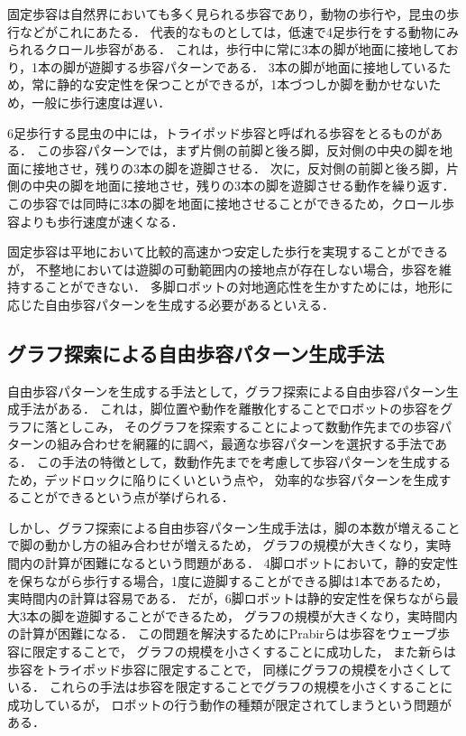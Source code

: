 固定歩容は自然界においても多く見られる歩容であり，動物の歩行や，昆虫の歩行などがこれにあたる．
代表的なものとしては，低速で4足歩行をする動物にみられるクロール歩容がある．
これは，歩行中に常に3本の脚が地面に接地しており，1本の脚が遊脚する歩容パターンである．
3本の脚が地面に接地しているため，常に静的な安定性を保つことができるが，1本づつしか脚を動かせないため，一般に歩行速度は遅い．

6足歩行する昆虫の中には，トライポッド歩容と呼ばれる歩容をとるものがある．
この歩容パターンでは，まず片側の前脚と後ろ脚，反対側の中央の脚を地面に接地させ，残りの3本の脚を遊脚させる．
次に，反対側の前脚と後ろ脚，片側の中央の脚を地面に接地させ，残りの3本の脚を遊脚させる動作を繰り返す．
この歩容では同時に3本の脚を地面に接地させることができるため，クロール歩容よりも歩行速度が速くなる．

固定歩容は平地において比較的高速かつ安定した歩行を実現することができるが，
不整地においては遊脚の可動範囲内の接地点が存在しない場合，歩容を維持することができない．
多脚ロボットの対地適応性を生かすためには，地形に応じた自由歩容パターンを生成する必要があるといえる．

\subsection{グラフ探索による自由歩容パターン生成手法}
自由歩容パターンを生成する手法として，グラフ探索による自由歩容パターン生成手法がある\cite{Prabir_Graph_search}．
これは，脚位置や動作を離散化することでロボットの歩容をグラフに落としこみ，
そのグラフを探索することによって数動作先までの歩容パターンの組み合わせを網羅的に調べ，最適な歩容パターンを選択する手法である．
この手法の特徴として，数動作先までを考慮して歩容パターンを生成するため，デッドロックに陥りにくいという点や，
効率的な歩容パターンを生成することができるという点が挙げられる．

しかし、グラフ探索による自由歩容パターン生成手法は，脚の本数が増えることで脚の動かし方の組み合わせが増えるため，
グラフの規模が大きくなり，実時間内の計算が困難になるという問題がある．
4脚ロボットにおいて，静的安定性を保ちながら歩行する場合，1度に遊脚することができる脚は1本であるため，
実時間内の計算は容易である．
だが，6脚ロボットは静的安定性を保ちながら最大3本の脚を遊脚することができるため，
グラフの規模が大きくなり，実時間内の計算が困難になる．
この問題を解決するためにPrabirらは歩容をウェーブ歩容に限定することで，
グラフの規模を小さくすることに成功した\cite{Prabir_Graph_search_Six}，
また新らは歩容をトライポッド歩容に限定することで\cite{Arata_Graph_search_Six}，
同様にグラフの規模を小さくしている．
これらの手法は歩容を限定することでグラフの規模を小さくすることに成功しているが，
ロボットの行う動作の種類が限定されてしまうという問題がある．

